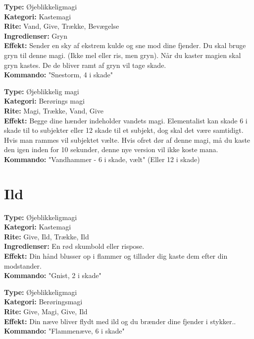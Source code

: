 \begin{vand*}[Snestorm]
\textbf{Type:} Øjeblikkeligmagi\\
\textbf{Kategori:} Kastemagi\\
\textbf{Rite:} Vand, Give, Trække, Bevægelse\\
\textbf{Ingredienser:} Gryn\\
\textbf{Effekt:} Sender en sky af ekstrem kulde og sne mod dine fjender. Du skal bruge gryn til denne magi. (Ikke mel eller ris, men gryn). Når du kaster magien skal gryn kastes. De de bliver ramt af gryn vil tage skade.\\
\textbf{Kommando:} "Snestorm, 4 i skade"
\end{vand*}

\begin{vand*}[Vandhammer]
\textbf{Type:} Øjeblikkelig magi\\
\textbf{Kategori:} Berørings magi\\
\textbf{Rite:} Magi, Trække, Vand, Give\\
\textbf{Effekt:} Begge dine hænder indeholder vandets magi. Elementalist kan skade 6 i skade til to subjekter eller 12 skade til et subjekt, dog skal det være samtidigt. Hvis man rammes vil subjektet vælte. Hvis ofret dør af denne magi, må du kaste den igen inden for 10 sekunder, denne nye version vil ikke koste mana.\\
\textbf{Kommando:} "Vandhammer - 6 i skade, vælt" (Eller 12 i skade)\\
\end{vand*}

\section{Ild}
\begin{ild*}[Gnist]
\textbf{Type:} Øjeblikkeligmagi\\
\textbf{Kategori:} Kastemagi\\
\textbf{Rite:} Give, Ild, Trække, Ild\\
\textbf{Ingredienser:} En rød skumbold eller rispose.\\
\textbf{Effekt:} Din hånd blusser op i flammer og tillader dig kaste dem efter din modstander.\\ 
\textbf{Kommando:} "Gnist, 2 i skade"
\end{ild*}

\begin{ild*}[Flammenæve]
\textbf{Type:} Øjeblikkeligmagi\\
\textbf{Kategori:} Berøringsmagi\\
\textbf{Rite:} Give, Magi, Give, Ild\\
\textbf{Effekt:} Din næve bliver flydt med ild og du brænder dine fjender i stykker..\\
\textbf{Kommando:} "Flammenæve, 6 i skade"
\end{ild*}

